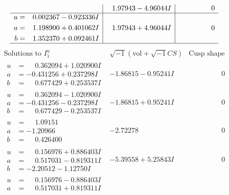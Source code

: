 \documentclass[1p]{elsarticle_modified}
\theoremstyle{definition}
\newcommand{\I}{\sqrt{-1}}
\begin{document}
$$\begin{array}{c|c|c}
 & \phantom{-}1.97943 - 4.96044 I & \phantom{-0.000000 } 0 \\ \hline\begin{aligned}
u &= \phantom{-}0.002367 - 0.923336 I \\
a &= \phantom{-}1.198900 + 0.401062 I \\
b &= \phantom{-}1.352370 + 0.092461 I\end{aligned}
 & \phantom{-}1.97943 + 4.96044 I & \phantom{-0.000000 } 0\\
 \hline 
 \end{array}$$\newpage$$\begin{array}{c|c|c}  
\text{Solutions to }I^u_{1}& \I (\text{vol} + \sqrt{-1}CS) & \text{Cusp shape}\\
 \hline 
\begin{aligned}
u &= \phantom{-}0.362094 + 1.020900 I \\
a &= -0.431256 + 0.237298 I \\
b &= \phantom{-}0.677429 + 0.253537 I\end{aligned}
 & -1.86815 - 0.95241 I & \phantom{-0.000000 } 0 \\ \hline\begin{aligned}
u &= \phantom{-}0.362094 - 1.020900 I \\
a &= -0.431256 - 0.237298 I \\
b &= \phantom{-}0.677429 - 0.253537 I\end{aligned}
 & -1.86815 + 0.95241 I & \phantom{-0.000000 } 0 \\ \hline\begin{aligned}
u &= \phantom{-}1.09151\phantom{ +0.000000I} \\
a &= -1.20966\phantom{ +0.000000I} \\
b &= \phantom{-}0.426400\phantom{ +0.000000I}\end{aligned}
 & -2.72278\phantom{ +0.000000I} & \phantom{-0.000000 } 0 \\ \hline\begin{aligned}
u &= \phantom{-}0.156976 + 0.886403 I \\
a &= \phantom{-}0.517031 - 0.819311 I \\
b &= -2.20512 - 1.12750 I\end{aligned}
 & -5.39558 + 5.25843 I & \phantom{-0.000000 } 0 \\ \hline\begin{aligned}
u &= \phantom{-}0.156976 - 0.886403 I \\
a &= \phantom{-}0.517031 + 0.819311 I \\

\end{aligned}
\end{array}$$
\end{document}
